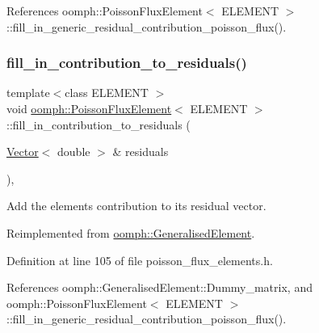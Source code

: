 References oomph\+::\+Poisson\+Flux\+Element$<$ E\+L\+E\+M\+E\+N\+T $>$\+::fill\+\_\+in\+\_\+generic\+\_\+residual\+\_\+contribution\+\_\+poisson\+\_\+flux().

\mbox{\label{classoomph_1_1PoissonFluxElement_aca66501e8cbbf029660e45819f3ba7d8}} 
\subsubsection{\texorpdfstring{fill\+\_\+in\+\_\+contribution\+\_\+to\+\_\+residuals()}{fill\_in\_contribution\_to\_residuals()}}
{\footnotesize\ttfamily template$<$class E\+L\+E\+M\+E\+NT $>$ \\
void \hyperlink{classoomph_1_1PoissonFluxElement}{oomph\+::\+Poisson\+Flux\+Element}$<$ E\+L\+E\+M\+E\+NT $>$\+::fill\+\_\+in\+\_\+contribution\+\_\+to\+\_\+residuals (\begin{DoxyParamCaption}\item[{\hyperlink{classoomph_1_1Vector}{Vector}$<$ double $>$ \&}]{residuals }\end{DoxyParamCaption})\hspace{0.3cm}{\ttfamily [inline]}, {\ttfamily [virtual]}}



Add the element\textquotesingle{}s contribution to its residual vector. 



Reimplemented from \hyperlink{classoomph_1_1GeneralisedElement_a310c97f515e8504a48179c0e72c550d7}{oomph\+::\+Generalised\+Element}.



Definition at line 105 of file poisson\+\_\+flux\+\_\+elements.\+h.



References oomph\+::\+Generalised\+Element\+::\+Dummy\+\_\+matrix, and oomph\+::\+Poisson\+Flux\+Element$<$ E\+L\+E\+M\+E\+N\+T $>$\+::fill\+\_\+in\+\_\+generic\+\_\+residual\+\_\+contribution\+\_\+poisson\+\_\+flux().

\mbox{\label{classoomph_1_1PoissonFluxElement_a78a7d6879d80f26ea06a905b721a3d25}} 
